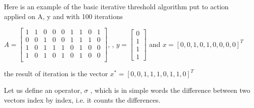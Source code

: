 Here is an example of the basic iterative threshold algorithm put to action applied on A, y and with 100 iterations

\vspace{5mm} 
$ A =  \begin{bmatrix}
1 & 1 & 0 & 0 & 0 & 1 & 1 & 0 &1 \\
0 & 0 & 1 & 0 & 0 & 1 & 1 & 1 &0 \\
1 & 0 & 1 & 1 & 1 & 0 & 1 & 0 &0 \\
1 & 0 & 1 & 0 & 1 & 0 & 1 & 0 &0 \\
\end{bmatrix}$,  \quad , $y = \begin{bmatrix}
0\\
1\\
1\\
1
\end{bmatrix}$
and $ x = [0, 0, 1, 0, 1, 0, 0, 0, 0]^{T} $ 

\vspace{5mm}
the result of iteration is the vector $ x^* = [0, 0, 1, 1, 1, 0, 1, 1, 0]^{T} $ 
\vspace{5mm}

Let us define an operator, $\sigma$  , which is in simple words the difference between two vectors index by index, i.e. it counts the differences. 

